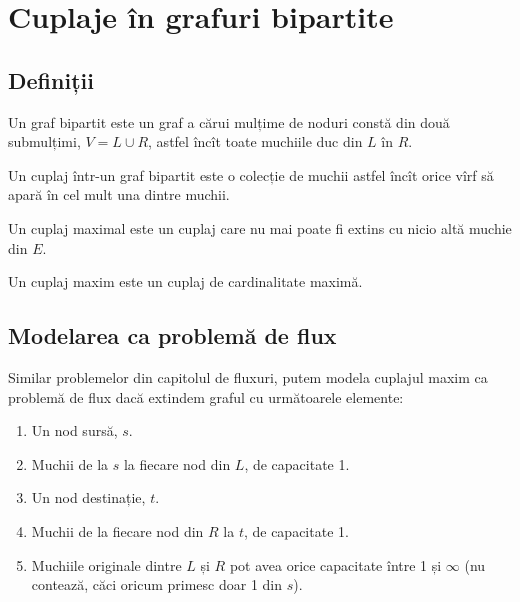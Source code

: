 \documentclass[../main.tex]{subfiles}
\begin{document}
\chapter{Cuplaje în grafuri bipartite}

\section{Definiții}

\begin{definition}
  Un graf bipartit este un graf a cărui mulțime de noduri constă din două submulțimi, $V = L \cup R$, astfel încît toate muchiile duc din $L$ în $R$.
\end{definition}

\begin{definition}
  Un cuplaj într-un graf bipartit este o colecție de muchii astfel încît orice vîrf să apară în cel mult una dintre muchii.
\end{definition}

\begin{definition}
  Un cuplaj maximal este un cuplaj care nu mai poate fi extins cu nicio altă muchie din $E$.
\end{definition}

\begin{definition}
  Un cuplaj maxim este un cuplaj de cardinalitate maximă.
\end{definition}

\section{Modelarea ca problemă de flux}

Similar problemelor din capitolul de fluxuri, putem modela cuplajul maxim ca problemă de flux dacă extindem graful cu următoarele elemente:

\begin{enumerate}
  \item Un nod sursă, $s$.
  \item Muchii de la $s$ la fiecare nod din $L$, de capacitate 1.
  \item Un nod destinație, $t$.
  \item Muchii de la fiecare nod din $R$ la $t$, de capacitate 1.
  \item Muchiile originale dintre $L$ și $R$ pot avea orice capacitate între 1 și $\infty$ (nu contează, căci oricum primesc doar 1 din $s$).
\end{enumerate}
\end{document}
